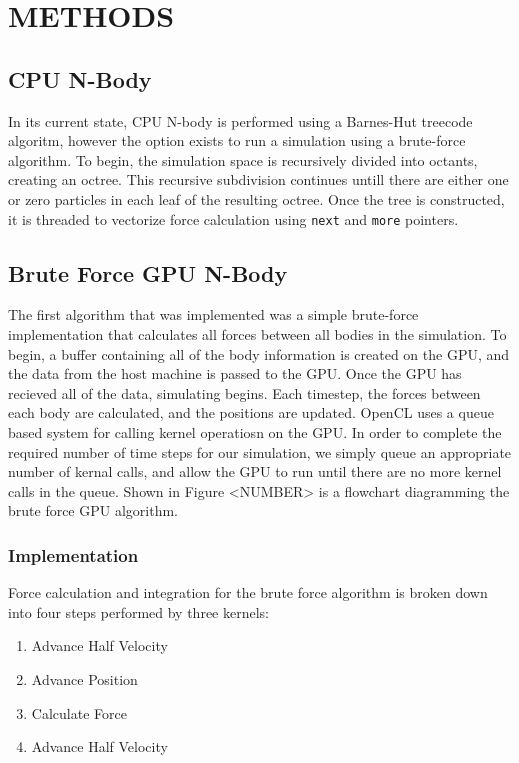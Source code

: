 \documentclass{thesis}
\begin{document}
\chapter{METHODS}
\section{CPU N-Body}
In its current state, CPU N-body is performed using a Barnes-Hut treecode algoritm, however the option exists to run a simulation using a brute-force algorithm. To begin, the simulation space is recursively divided into octants, creating an octree. This recursive subdivision continues untill there are either one or zero particles in each leaf of the resulting octree. Once the tree is constructed, it is threaded to vectorize force calculation using \texttt{next} and \texttt{more} pointers. 
\section{Brute Force GPU N-Body}
The first algorithm that was implemented was a simple brute-force implementation that calculates all forces between all bodies in the simulation. To begin, a buffer containing all of the body information is created on the GPU, and the data from the host machine is passed to the GPU. Once the GPU has recieved all of the data, simulating begins. Each timestep, the forces between each body are calculated, and the positions are updated. OpenCL uses a queue based system for calling kernel operatiosn on the GPU. In order to complete the required number of time steps for our simulation, we simply queue an appropriate number of kernal calls, and allow the GPU to run until there are no more kernel calls in the queue. Shown in Figure <NUMBER> is a flowchart diagramming the brute force GPU algorithm.
\subsection{Implementation}
Force calculation and integration for the brute force algorithm is broken down into four steps performed by three kernels:
\begin{enumerate}
    \item Advance Half Velocity
    \item Advance Position
    \item Calculate Force
    \item Advance Half Velocity
\end{enumerate}
\end{document}
